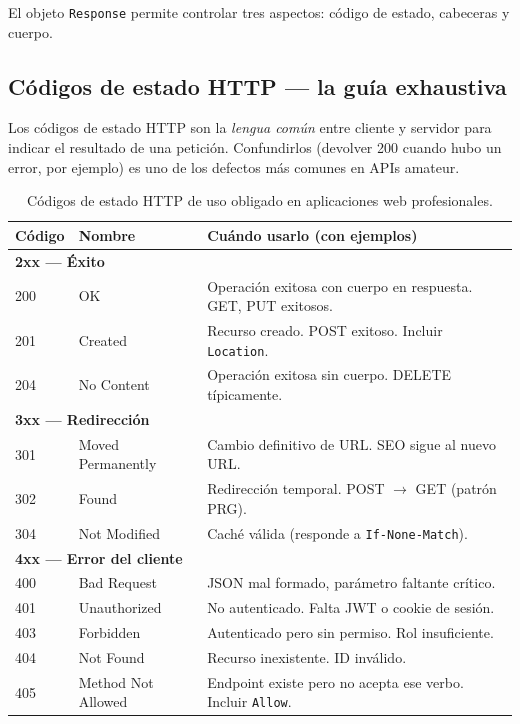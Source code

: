 El objeto \texttt{Response} permite controlar tres aspectos:
código de estado, cabeceras y cuerpo.

\subsection{Códigos de estado HTTP --- la guía exhaustiva}

Los códigos de estado HTTP son la \emph{lengua común} entre
cliente y servidor para indicar el resultado de una petición.
Confundirlos (devolver 200 cuando hubo un error, por ejemplo) es uno
de los defectos más comunes en APIs amateur.


\begin{table}[htbp]
\centering
\caption{Códigos de estado HTTP de uso obligado en aplicaciones web profesionales.}
\footnotesize
\begin{tabularx}{\textwidth}{llX}
\toprule
\textbf{Código} & \textbf{Nombre} & \textbf{Cuándo usarlo (con ejemplos)}\\
\midrule
\multicolumn{3}{l}{\textbf{2xx --- Éxito}}\\
200 & OK                  & Operación exitosa con cuerpo en respuesta. GET, PUT exitosos.\\
201 & Created             & Recurso creado. POST exitoso. Incluir \texttt{Location}.\\
204 & No Content          & Operación exitosa sin cuerpo. DELETE típicamente.\\
\midrule
\multicolumn{3}{l}{\textbf{3xx --- Redirección}}\\
301 & Moved Permanently   & Cambio definitivo de URL. SEO sigue al nuevo URL.\\
302 & Found               & Redirección temporal. POST $\to$ GET (patrón PRG).\\
304 & Not Modified        & Caché válida (responde a \texttt{If-None-Match}).\\
\midrule
\multicolumn{3}{l}{\textbf{4xx --- Error del cliente}}\\
400 & Bad Request         & JSON mal formado, parámetro faltante crítico.\\
401 & Unauthorized        & No autenticado. Falta JWT o cookie de sesión.\\
403 & Forbidden           & Autenticado pero sin permiso. Rol insuficiente.\\
404 & Not Found           & Recurso inexistente. ID inválido.\\
405 & Method Not Allowed  & Endpoint existe pero no acepta ese verbo. Incluir \texttt{Allow}.\\

\end{tabularx}
\end{table}
